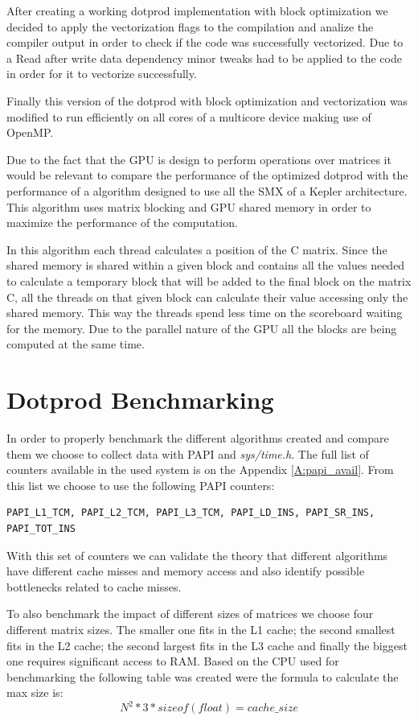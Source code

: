 \documentclass[a4paper]{report}
\begin{document}
After creating a working dotprod implementation with block optimization we
decided to apply the vectorization flags to the compilation and analize the
compiler output in order to check if the code was successfully vectorized. Due
to a Read after write data dependency minor tweaks had to be applied to the code
in order for it to vectorize successfully.

Finally this version of the dotprod with block optimization and vectorization
was modified to run efficiently on all cores of a multicore device making use of
OpenMP.

Due to the fact that the GPU is design to perform operations over matrices it
would be relevant to compare the performance of the optimized dotprod with the
performance of a algorithm designed to use all the SMX of a Kepler architecture.
This algorithm uses matrix blocking and GPU shared memory in order to maximize
the performance of the computation.

In this algorithm each thread calculates a position of the C matrix. Since the
shared memory is shared within a given block and contains all the values needed
to calculate a temporary block that will be added to the final block on the
matrix C, all the threads on that given block can calculate their value
accessing only the shared memory. This way the threads spend less time on the
scoreboard waiting for the memory. Due to the parallel nature of the GPU all the
blocks are being computed at the same time.

\chapter{Dotprod Benchmarking}
In order to properly benchmark the different algorithms created and compare them
we choose to collect data with PAPI and \textit{sys/time.h}. The full list of
counters available in the used system is on the Appendix \ref{A:papi_avail}. From
this list we choose to use the following PAPI counters:
\begin{verbatim}
PAPI_L1_TCM, PAPI_L2_TCM, PAPI_L3_TCM, PAPI_LD_INS, PAPI_SR_INS, PAPI_TOT_INS
\end{verbatim}

With this set of counters we can validate the theory that different algorithms
have different cache misses and memory access and also identify possible
bottlenecks related to cache misses.

To also benchmark the impact of different sizes of matrices we choose four
different matrix sizes. The smaller one fits in the L1 cache; the second
smallest fits in the L2 cache; the second largest fits in the L3 cache and
finally the biggest one requires significant access to RAM. Based on the CPU
used for benchmarking the following table was created were the formula to
calculate the max size is: \[N^2*3*sizeof(float) = cache\_size\]
\end{document}
